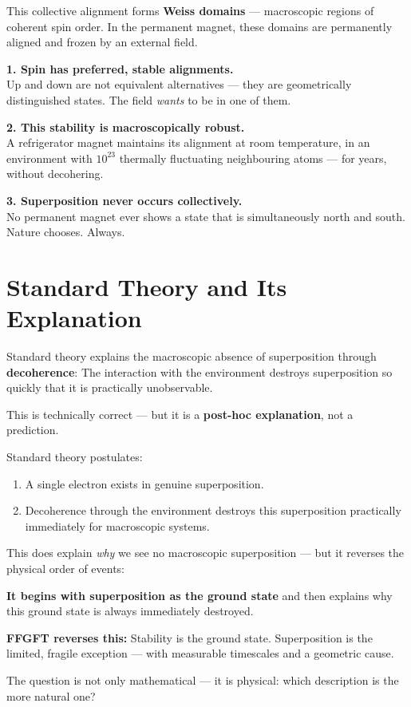 This collective alignment forms \textbf{Weiss domains} ---
macroscopic regions of coherent spin order.
In the permanent magnet, these domains are permanently
aligned and frozen by an external field.

\begin{keyresult}
\textbf{1. Spin has preferred, stable alignments.}\\
Up and down are not equivalent alternatives ---
they are geometrically distinguished states.
The field \emph{wants} to be in one of them.

\textbf{2. This stability is macroscopically robust.}\\
A refrigerator magnet maintains its alignment
at room temperature, in an environment with $10^{23}$
thermally fluctuating neighbouring atoms ---
for years, without decohering.

\textbf{3. Superposition never occurs collectively.}\\
No permanent magnet ever shows a state
that is simultaneously north and south.
Nature chooses. Always.
\end{keyresult}

\section{Standard Theory and Its Explanation}
\label{sec:standard}

Standard theory explains the macroscopic absence
of superposition through \textbf{decoherence}:
The interaction with the environment destroys superposition
so quickly that it is practically unobservable.

This is technically correct --- but it is a
\textbf{post-hoc explanation}, not a prediction.

\begin{important}
Standard theory postulates:
\begin{enumerate}
  \item A single electron exists in genuine superposition.
  \item Decoherence through the environment destroys this superposition
    practically immediately for macroscopic systems.
\end{enumerate}

This does explain \emph{why} we see no macroscopic
superposition --- but it reverses the physical
order of events:

\textbf{It begins with superposition as the ground state}
and then explains why this ground state is always immediately
destroyed.

\textbf{FFGFT reverses this:}
Stability is the ground state.
Superposition is the limited, fragile exception ---
with measurable timescales and a geometric cause.

The question is not only mathematical --- it is physical:
which description is the more natural one?
\end{important}

